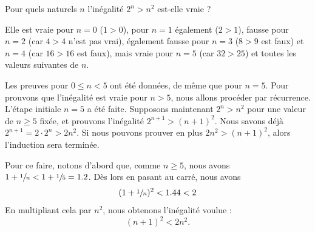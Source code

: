 \documentclass[12pt,french,oneside,a4paper]{memoir} %
\begin{document}
\begin{exo}
  Pour quels naturels $n$ l'inégalité $2^n > n^2$ est-elle vraie ?
  \begin{correction}
    Elle est vraie pour $n = 0$ ($1 > 0$), pour $n = 1$ également ($2 > 1$), fausse pour $n = 2$ (car $4 > 4$ n'est pas vrai), également fausse pour $n = 3$ ($8 > 9$ est faux) et $n = 4$ (car $16 > 16$ est faux), mais vraie pour $n = 5$ (car $32 > 25$) et toutes les valeurs suivantes de $n$.

    Les preuves pour $0 \leq n < 5$ ont été données, de même que pour $n = 5$. Pour prouvons que l'inégalité est vraie pour $n > 5$, nous allons procéder par récurrence. L'étape initiale $n = 5$ a été faite. Supposons maintenant $2^{n} > n^{2}$ pour une valeur de $n \geq 5$ fixée, et prouvons l'inégalité $2^{n+1} > (n+1)^{2}$. Nous savons déjà $2^{n+1} = 2 \cdot 2^{n} > 2 n^{2}$. Si nous pouvons prouver en plus $2 n^{2} > (n+1)^{2}$, alors l'induction sera terminée. %

    Pour ce faire, notons d'abord que, comme $n \geq 5$, nous avons $1 + \sfrac 1n < 1 + \sfrac 15 = 1.2$. Dès lors en pasant au carré, nous avons
    \begin{equation*}
      (1+\sfrac 1n)^{2} < 1.44 < 2
    \end{equation*}
    En multipliant cela par $n^{2}$, nous obtenons l'inégalité voulue :
    \begin{equation*}
      (n + 1)^{2} < 2n^{2}.
    \end{equation*}
\end{correction}
\end{exo}

\end{document}
